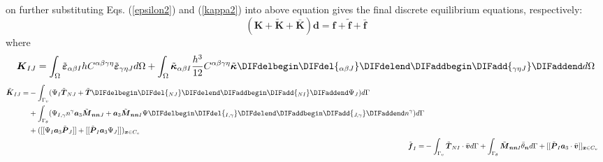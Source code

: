 on further substituting Eqs. (\ref{epsilon2}) and (\ref{kappa2}) into above equation gives the final discrete equilibrium equations, respectively: 
\begin{equation}
        (\boldsymbol K + \tilde{\boldsymbol K} + \bar{\boldsymbol K} )\boldsymbol d = \boldsymbol f + \tilde{\boldsymbol f} + \bar{\boldsymbol f}
\end{equation}
where 
\begin{equation}\label{de1}
        \boldsymbol K_{IJ} = \int_\Omega \tilde{\boldsymbol \varepsilon}_{\alpha\beta I} hC^{\alpha\beta\gamma\eta}\tilde{\boldsymbol \varepsilon}_{\gamma\eta J} d\Omega + \int_\Omega \tilde{\boldsymbol \kappa}_{\alpha\beta I} \frac{h^3}{12}C^{\alpha\beta\gamma\eta} \tilde{\boldsymbol \kappa}\DIFdelbegin \DIFdel{_{\alpha\beta J} }\DIFdelend \DIFaddbegin \DIFadd{_{\gamma\eta J} }\DIFaddend d\Omega
\end{equation}
\begin{subequations}\label{de2}
\begin{align}
\begin{split}
        \tilde{\boldsymbol K}_{IJ} = &- \int_{\Gamma_v} (\Psi_I \tilde{\boldsymbol T}_{NJ} + \tilde{\boldsymbol T}\DIFdelbegin \DIFdel{_{NJ} }\DIFdelend \DIFaddbegin \DIFadd{_{NI} }\DIFaddend \Psi_J) d\Gamma \\
                                     &+ \int_{\Gamma_\theta} (\Psi_{I,\gamma} n^\gamma \boldsymbol a_3 \tilde{\boldsymbol M}_{\boldsymbol{nn}J} + \boldsymbol a_3 \tilde{\boldsymbol M}_{\boldsymbol{nn}I} \Psi\DIFdelbegin \DIFdel{_{I,\gamma}}\DIFdelend \DIFaddbegin \DIFadd{_{J,\gamma}}\DIFaddend n^\gamma)d\Gamma \\
                                     & + ([[\Psi_I \boldsymbol a_3 \tilde{\boldsymbol P}_J]] + [[\tilde{\boldsymbol P}_I \boldsymbol a_3 \Psi_J]])_{\boldsymbol x \in C_v}
\end{split} \\
\tilde{\boldsymbol f}_I = &- \int_{\Gamma_v} \tilde{\boldsymbol T}_{NI} \cdot \bar{\boldsymbol v} d\Gamma + \int_{\Gamma_\theta} \tilde{\boldsymbol M}_{\boldsymbol{nn}I} \bar{\theta}_{\boldsymbol n} d\Gamma + [[\tilde{\boldsymbol P}_I\boldsymbol a_3 \cdot \bar{\boldsymbol v}]]_{\boldsymbol x \in C_v}
\end{align}
\end{subequations}
